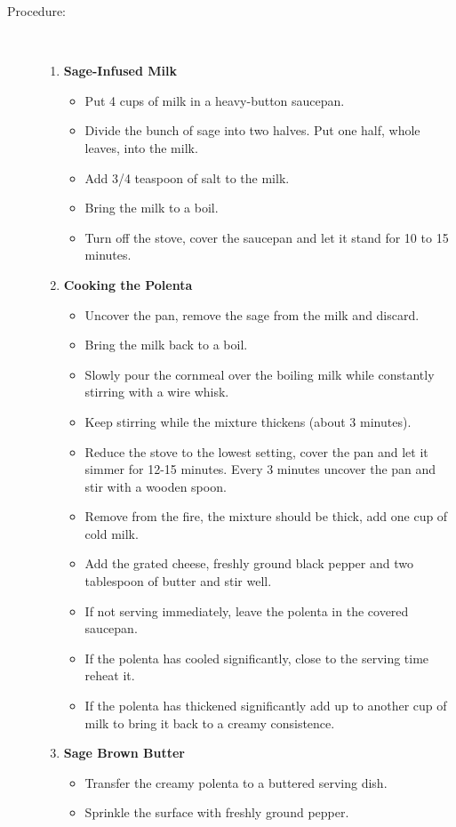 \documentclass[11pt,letterpaper]{article}
\begin{document}
\begin{description}
\item[Procedure:]\ \\
	\begin{enumerate}
	\item {\bf Sage-Infused Milk}
	\begin{itemize}
	\item Put 4 cups of milk in a heavy-button saucepan.
	\item Divide the bunch of sage into two halves. Put one half, whole leaves, into the milk.
	\item Add 3/4 teaspoon of salt to the milk.
	\item Bring the milk to a boil.
	\item Turn off the stove, cover the saucepan and let it stand for 10 to 15 minutes.
	\end{itemize}
	\item {\bf Cooking the Polenta}
	\begin{itemize}
	\item Uncover the pan, remove the sage from the milk and discard.
	 \item Bring the milk back to a boil.
	 \item Slowly pour the cornmeal over the boiling milk while constantly stirring with a wire whisk.
	 \item Keep stirring while the mixture thickens (about 3 minutes).
	 \item Reduce the stove to the lowest setting, cover the pan and let it simmer for 12-15 minutes. Every 3 minutes uncover the pan and stir with a wooden spoon.
	 \item Remove from the fire, the mixture should be thick, add one cup of cold milk.
	 \item  Add the grated cheese, freshly ground black pepper and two tablespoon of butter and stir well.
	 \item If not serving immediately, leave the polenta in the covered saucepan.
	 \item If the polenta has cooled significantly, close to the serving time reheat it.
	 \item If the polenta has thickened significantly add up to another cup of milk to bring it back to a creamy consistence.
	\end{itemize}
	\item {\bf Sage Brown Butter}
	\begin{itemize}
        		\item Transfer the creamy polenta to a buttered serving dish.
		\item Sprinkle the surface with freshly ground pepper.

\end{itemize}
\end{enumerate}
\end{description}
\end{document}
